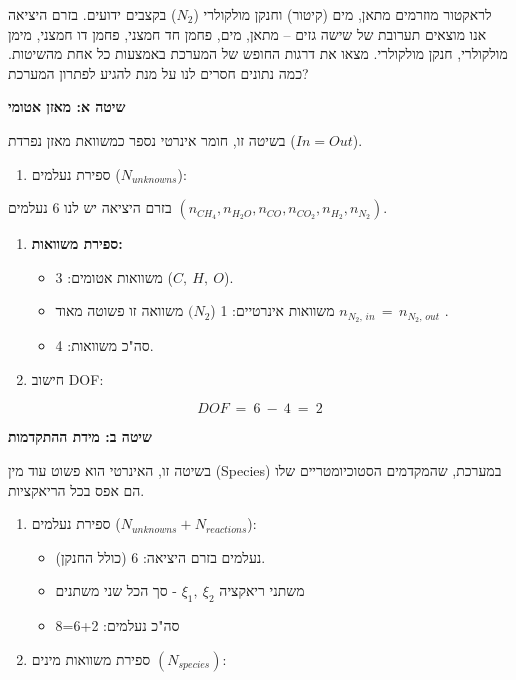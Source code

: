 \documentclass[
  hebrew,
  letterpaper,
  DIV=11,
  numbers=noendperiod]{scrreprt}
\providecommand{\tightlist}{%
  \setlength{\itemsep}{0pt}\setlength{\parskip}{0pt}}
\begin{document}
לראקטור מוזרמים מתאן, מים (קיטור) וחנקן מולקולרי (\(N_{2}\)) בקצבים
ידועים. בזרם היציאה אנו מוצאים תערובת של שישה גזים -- מתאן, מים, פחמן חד
חמצני, פחמן דו חמצני, מימן מולקולרי, חנקן מולקולרי. מצאו את דרגות החופש
של המערכת באמצעות כל אחת מהשיטות. כמה נתונים חסרים לנו על מנת להגיע
לפתרון המערכת?

\textbf{שיטה א\textquotesingle: מאזן אטומי}

בשיטה זו, חומר אינרטי נספר כמשוואת מאזן נפרדת (\(In = Out\)).

\begin{enumerate}
\def\labelenumi{\arabic{enumi}.}
\tightlist
\item
  ספירת נעלמים (\(N_{unknowns}\)):
\end{enumerate}

בזרם היציאה יש לנו 6 נעלמים
\(\left( n_{CH_{4}},n_{H_{2}O},n_{CO},n_{CO_{2}},n_{H_{2}},n_{N_{2}} \right).\)

\begin{enumerate}
\def\labelenumi{\arabic{enumi}.}
\setcounter{enumi}{1}
\item
  \textbf{ספירת משוואות:}

  \begin{itemize}
  \item
    משוואות אטומים: 3 (\(C,\ H,\ O\)).
  \item
    משוואות אינרטיים: 1 (\((N_{2}\) משוואה זו פשוטה מאוד
    \(n_{N_{2},\, in}\, = \, n_{N_{2},\, out}\) .
  \item
    סה"כ משוואות: 4.
  \end{itemize}
\item
  חישוב DOF:
\end{enumerate}

\[DOF\  = \ 6\  - \ 4\  = \ 2\]

\textbf{שיטה ב\textquotesingle: מידת ההתקדמות}

בשיטה זו, האינרטי הוא פשוט עוד מין (Species) במערכת, שהמקדמים
הסטוכיומטריים שלו הם אפס בכל הריאקציות.

\begin{enumerate}
\def\labelenumi{\arabic{enumi}.}
\item
  ספירת נעלמים (\(N_{unknowns} + N_{reactions}\)):

  \begin{itemize}
  \item
    נעלמים בזרם היציאה: 6 (כולל החנקן).
  \item
    משתני ריאקציה \(\xi_{1},\ \xi_{2}\) - סך הכל שני משתנים
  \item
    סה"כ נעלמים: 6+2=8
  \end{itemize}
\item
  ספירת משוואות מינים \(\left( N_{species} \right):\)
\end{enumerate}
\end{document}
